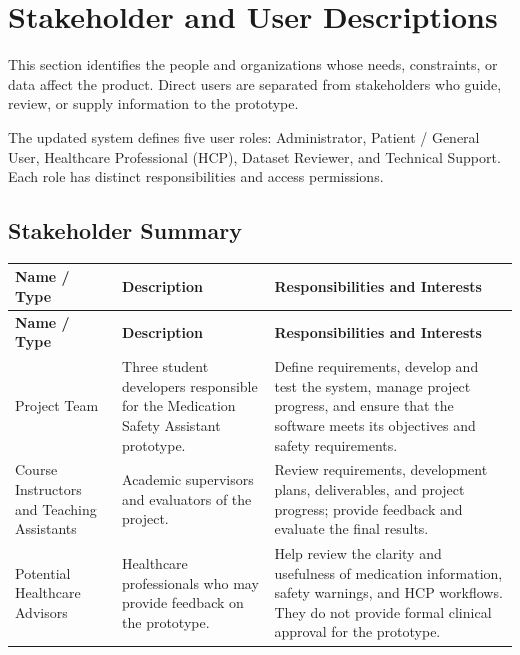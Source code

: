 \providecommand{\PAChange}[1]{%
    \textcolor{instructionblue}{#1}%
}

\section{Stakeholder and User Descriptions}

This section identifies the people and organizations whose needs,
constraints, or data affect the product. Direct users are separated
from stakeholders who guide, review, or supply information to the
prototype.

\PAChange{The updated system defines five user roles:
Administrator, Patient / General User, Healthcare Professional (HCP),
Dataset Reviewer, and Technical Support. Each role has distinct
responsibilities and access permissions.}



\subsection{Stakeholder Summary}

\begin{longtable}{|
    L{0.20\textwidth}|
    L{0.27\textwidth}|
    L{0.43\textwidth}|
}
\hline
\textbf{Name / Type} &
\textbf{Description} &
\textbf{Responsibilities and Interests}\\
\hline
\endfirsthead

\hline
\textbf{Name / Type} &
\textbf{Description} &
\textbf{Responsibilities and Interests}\\
\hline
\endhead

Project Team
& Three student developers responsible for the
Medication Safety Assistant prototype.
& Define requirements, develop and test the system,
manage project progress, and ensure that the
software meets its objectives and safety requirements.
\\ \hline

Course Instructors and Teaching Assistants
& Academic supervisors and evaluators of the project.
& Review requirements, development plans,
deliverables, and project progress; provide
feedback and evaluate the final results.
\\ \hline

Potential Healthcare Advisors
& Healthcare professionals who may provide
feedback on the prototype.
& Help review the clarity and usefulness of
medication information, safety warnings, and
HCP workflows. They do not provide formal
clinical approval for the prototype.
\\ \hline

\end{longtable}


